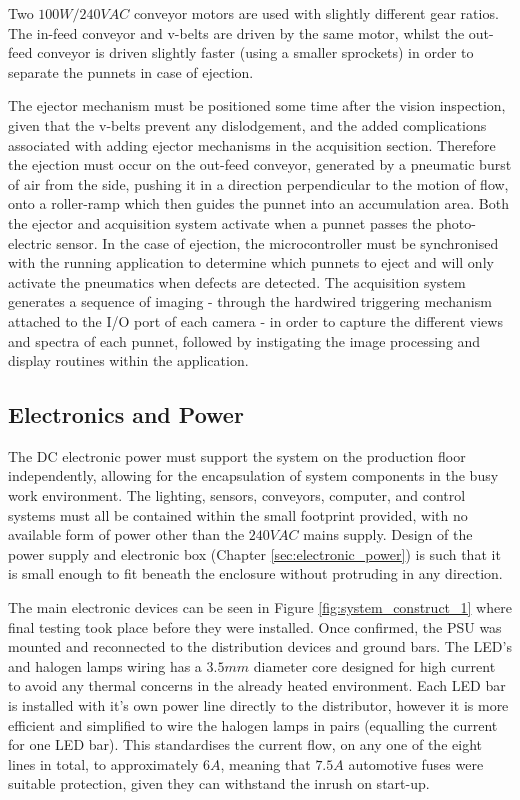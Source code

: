 \documentclass[fleqn,twoside,12pt]{report}
\begin{document}
Two $100W/240VAC$ conveyor motors are used with slightly different gear ratios. The in-feed conveyor and v-belts are driven by the same motor, whilst the out-feed conveyor is driven slightly faster (using a smaller sprockets) in order to separate the punnets in case of ejection.


The ejector mechanism must be positioned some time after the vision inspection, given that the v-belts prevent any dislodgement, and the added complications associated with adding ejector mechanisms in the acquisition section. Therefore the ejection must occur on the out-feed conveyor, generated by a pneumatic burst of air from the side, pushing it in a direction perpendicular to the motion of flow, onto a roller-ramp which then guides the punnet into an accumulation area. Both the ejector and acquisition system activate when a punnet passes the photo-electric sensor. In the case of ejection, the microcontroller must be synchronised with the running application to determine which punnets to eject and will only activate the pneumatics when defects are detected. The acquisition system generates a sequence of imaging - through the hardwired triggering mechanism attached to the I/O port of each camera - in order to capture the different views and spectra of each punnet, followed by instigating the image processing and display routines within the application. 


\subsection{Electronics and Power}

The DC electronic power must support the system on the production floor independently, allowing for the encapsulation of system components in the busy work environment. The lighting, sensors, conveyors, computer, and control systems must all be contained within the small footprint provided, with no available form of power other than the $240VAC$ mains supply. Design of the power supply and electronic box (Chapter \ref{sec:electronic_power}) is such that it is small enough to fit beneath the enclosure without protruding in any direction. 


The main electronic devices can be seen in Figure \ref{fig:system_construct_1} where final testing took place before they were installed. Once confirmed, the PSU was mounted and reconnected to the distribution devices and ground bars. The LED's and halogen lamps wiring has a $3.5mm$ diameter core designed for high current to avoid any thermal concerns in the already heated environment. Each LED bar is installed with it's own power line directly to the distributor, however it is more efficient and simplified to wire the halogen lamps in pairs (equalling the current for one LED bar). This standardises the current flow, on any one of the eight lines in total, to approximately $6A$, meaning that $7.5A$ automotive fuses were suitable protection, given they can withstand the inrush on start-up. 
\end{document}
